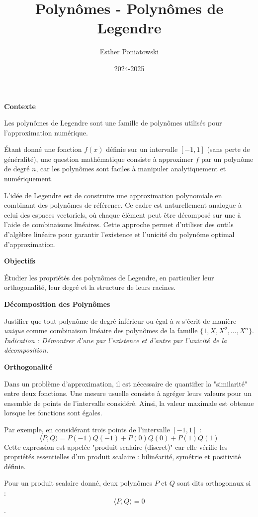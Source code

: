 \documentclass[10pt,a4paper]{article}
\title{Polynômes - Polynômes de Legendre}
\author{Esther Poniatowski}
\date{2024-2025}
\begin{document}

\bigskip
\textbf{Contexte}

Les polynômes de Legendre sont une famille de polynômes utilisés pour l'approximation numérique.

Étant donné une fonction $f(x)$ définie sur un intervalle $[-1,1]$ (sans perte de généralité), une
question mathématique consiste à approximer $f$ par un polynôme de degré $n$, car les polynômes sont
faciles à manipuler analytiquement et numériquement.

L'idée de Legendre est de construire une approximation polynomiale en combinant des polynômes de
référence. Ce cadre est naturellement analogue à celui des espaces vectoriels, où chaque élément
peut être décomposé sur une à l'aide de combinaisons linéaires. Cette approche permet
d'utiliser des outils d'algèbre linéaire pour garantir l'existence et l'unicité du polynôme optimal
d'approximation.


\bigskip
\textbf{Objectifs}

Étudier les propriétés des polynômes de Legendre, en particulier leur orthogonalité, leur degré et
la structure de leurs racines.

\bigskip
\textbf{Décomposition des Polynômes}

\q Justifier que tout polynôme de degré inférieur ou égal à $n$ s'écrit de manière \textit{unique}
comme combinaison linéaire des polynômes de la famille $\{1, X, X^2, \dots, X^n\}$.
\textit{Indication : Démontrer d'une par l'existence et d'autre par l'unicité de la décomposition.}

\bigskip
\textbf{Orthogonalité}

Dans un problème d'approximation, il est nécessaire de quantifier la "similarité" entre deux
fonctions. Une mesure usuelle consiste à agréger leurs valeurs pour un ensemble de points de
l'intervalle considéré. Ainsi, la valeur maximale est obtenue lorsque les fonctions sont égales.

Par exemple, en considérant trois points de l'intervalle $[-1,1]$ :
\[
\langle P, Q \rangle = P(-1)Q(-1) + P(0)Q(0) + P(1)Q(1)
\]
Cette expression est appelée "produit scalaire (discret)" car elle vérifie les propriétés
essentielles d'un produit scalaire : bilinéarité, symétrie et positivité définie.

Pour un produit scalaire donné, deux polynômes $P$ et $Q$ sont dits orthogonaux si :
$$\langle P, Q \rangle = 0$$.
\end{document}
